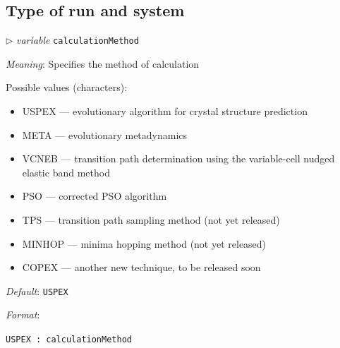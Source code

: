 \documentclass[12pt]{article}
\newcommand{\paramacro}[6]{
\vspace{0.5cm}
$\triangleright$ \emph{variable} {\color{blue} \texttt{#1}}

\emph{Meaning}: {#2}

{#3}

\emph{Default}: \texttt{#4}

\emph{Format}:

{\addtolength{\leftskip}{10mm} 
\texttt{#5}
\par}


{\small #6}

}
\begin{document}
\subsection{Type of run and system}
\paramacro{calculationMethod}{Specifies the method of calculation}{

Possible values (characters):
\begin{itemize}
\item USPEX --- evolutionary algorithm for crystal structure prediction
\item META --- evolutionary metadynamics
\item VCNEB --- transition path determination using the variable-cell nudged
elastic band method
\item PSO --- corrected PSO algorithm
\item TPS --- transition path sampling method (not yet released)
\item MINHOP --- minima hopping method (not yet released)
\item COPEX --- another new technique, to be released soon
\end{itemize}

}{USPEX}{USPEX    : calculationMethod}{}
\end{document}

